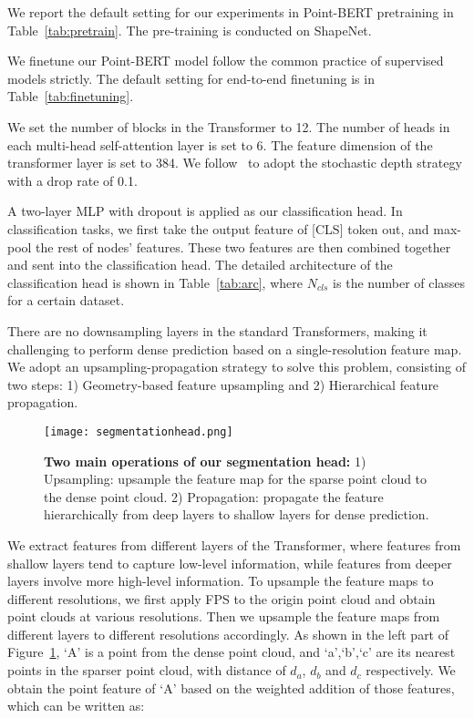 \begin{appendix}
We report the default setting for our experiments in Point-BERT pretraining in Table~\ref{tab:pretrain}. The pre-training is conducted on ShapeNet.

We finetune our Point-BERT model follow the common practice of supervised models strictly. The default setting for end-to-end finetuning is in Table~\ref{tab:finetuning}.

We set the number of blocks in the Transformer to 12. The number of heads in each multi-head self-attention layer is set to 6. The feature dimension of the transformer layer is set to 384. We follow~\cite{touvron2021training} to adopt the stochastic depth strategy with a drop rate of 0.1.

A two-layer MLP with dropout is applied as our classification head. In classification tasks, we first take the output feature of [CLS] token out, and max-pool the rest of nodes' features. These two features are then combined together and sent into the classification head. The detailed architecture of the classification head is shown in Table~\ref{tab:arc}, where $N_{cls}$ is the number of classes for a certain dataset.

There are no downsampling layers in the standard Transformers, making it challenging to perform dense prediction based on a single-resolution feature map. We adopt an upsampling-propagation strategy to solve this problem, consisting of two steps: 1) Geometry-based feature upsampling and 2) Hierarchical feature propagation. 

\begin{figure}[t]
\centering
\texttt{[image: segmentationhead.png]}
\caption{\small \textbf{Two main operations of our segmentation head:} 1) Upsampling: upsample the feature map for the sparse point cloud to the dense point cloud. 2) Propagation: propagate the feature hierarchically from deep layers to shallow layers for dense prediction.}
\label{fig:supp_seg} 
\end{figure}

We extract features from different layers of the Transformer, where features from shallow layers tend to capture low-level information,  while features from deeper layers involve more high-level information. To upsample the feature maps to different resolutions, we first apply FPS to the origin point cloud and obtain point clouds at various resolutions. Then we upsample the feature maps from different layers to different resolutions accordingly. As shown in the left part of Figure~\ref{fig:supp_seg}, `A' is a point from the dense point cloud, and `a',`b',`c' are its nearest points in the sparser point cloud,  with distance of $d_a$, $d_b$ and $d_c$ respectively. We obtain the point feature of `A' based on the weighted addition of those features, which can be written as:


\end{appendix}
